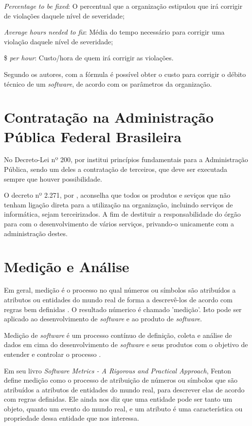 \textit{Percentage to be fixed}: O percentual que a organização estipulou que irá corrigir
de violações daquele nível de severidade;

\textit{Average hours needed to fix}: Média do tempo necessário para corrigir uma violação
daquele nível de severidade;

\$ \textit{per hour}: Custo/hora de quem irá corrigir as violações.

Segundo os autores, com a fórmula é possível obter o custo para corrigir o débito
técnico de um \textit{software}, de acordo com os parâmetros da organização.

\section{Contratação na Administração Pública Federal Brasileira}

No Decreto-Lei nº 200, \cite{decreto200} por institui princípios fundamentais para a
Administração Pública, sendo um deles a contratação de terceiros, que deve ser
executada sempre que houver possibilidade.

O decreto nº 2.271, por \cite{decreto2271}, aconselha que todos os produtos e seviços
que não tenham ligação direta para a utilização na organização, incluindo serviços
de informática, sejam terceirizados. A fim de destituir a responsabilidade do
órgão para com o desenvolvimento de vários serviços, privando-o unicamente com
a administração destes.

\section{Medição e Análise}
Em geral, medição é o processo no qual números ou símbolos são atribuídos a
atributos ou entidades do mundo real de forma a descrevê-los de acordo com regras
bem definidas \cite{fentonpfleeger}. O resultado númerico é chamado 'medição'.
Isto pode ser aplicado ao desenvolvimento de \textit{software} e ao produto de \textit{software}.

Medição de \textit{software} é um processo contínuo de definição, coleta e análise de
dados em cima do desenvolvimento de \textit{software} e seus produtos com o objetivo de
entender e controlar o processo \cite{egon}.


Em seu livro \textit{Software Metrics - A Rigorous and Practical Approach}, Fenton define
medição como o processo de atribuição de números ou símbolos que são atribuídos
a atributos de entidades do mundo real, para descrever elas de acordo com regras
definidas. Ele ainda nos diz que uma entidade pode ser tanto um objeto, quanto
um evento do mundo real, e um atributo é uma característica ou propriedade dessa
entidade que nos interessa.

